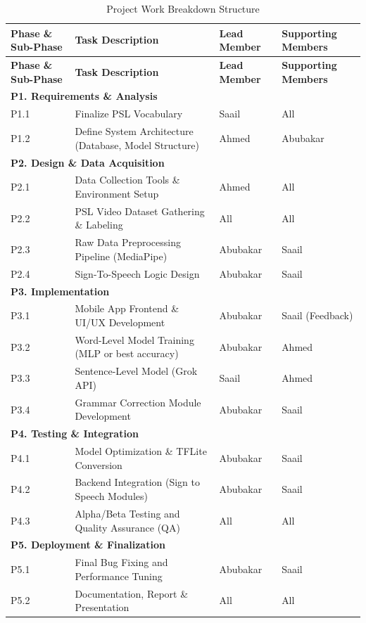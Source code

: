\documentclass[12pt,a4paper,oneside]{report}
\begin{document}
\begin{longtable}{|p{1.2in}|p{2.2in}|p{1in}|p{1.3in}|}
\caption{Project Work Breakdown Structure}\label{tab:wbs}\\
\hline
\textbf{Phase \& Sub-Phase} & \textbf{Task Description} & \textbf{Lead Member} & \textbf{Supporting Members} \\
\hline
\endfirsthead
\hline
\textbf{Phase \& Sub-Phase} & \textbf{Task Description} & \textbf{Lead Member} & \textbf{Supporting Members} \\
\hline
\endhead
\multicolumn{4}{|l|}{\textbf{P1. Requirements \& Analysis}} \\
\hline
P1.1 & Finalize PSL Vocabulary & Saail & All \\
\hline
P1.2 & Define System Architecture (Database, Model Structure) & Ahmed & Abubakar \\
\hline
\multicolumn{4}{|l|}{\textbf{P2. Design \& Data Acquisition}} \\
\hline
P2.1 & Data Collection Tools \& Environment Setup & Ahmed & All \\
\hline
P2.2 & PSL Video Dataset Gathering \& Labeling & All & All \\
\hline
P2.3 & Raw Data Preprocessing Pipeline (MediaPipe) & Abubakar & Saail \\
\hline
P2.4 & Sign-To-Speech Logic Design & Abubakar & Saail \\
\hline
\multicolumn{4}{|l|}{\textbf{P3. Implementation}} \\
\hline
P3.1 & Mobile App Frontend \& UI/UX Development & Abubakar & Saail (Feedback) \\
\hline
P3.2 & Word-Level Model Training (MLP or best accuracy) & Abubakar & Ahmed \\
\hline
P3.3 & Sentence-Level Model (Grok API) & Saail & Ahmed \\
\hline
P3.4 & Grammar Correction Module Development & Abubakar & Saail \\
\hline
\multicolumn{4}{|l|}{\textbf{P4. Testing \& Integration}} \\
\hline
P4.1 & Model Optimization \& TFLite Conversion & Abubakar & Saail \\
\hline
P4.2 & Backend Integration (Sign to Speech Modules) & Abubakar & Saail \\
\hline
P4.3 & Alpha/Beta Testing and Quality Assurance (QA) & All & All \\
\hline
\multicolumn{4}{|l|}{\textbf{P5. Deployment \& Finalization}} \\
\hline
P5.1 & Final Bug Fixing and Performance Tuning & Abubakar & Saail \\
\hline
P5.2 & Documentation, Report \& Presentation & All & All \\
\hline
\end{longtable}
\end{document}
